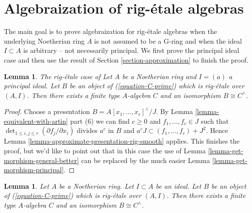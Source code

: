 \documentclass{stacks-project}
\newenvironment{reference}{\comment}{\endcomment}
\theoremstyle{plain}
\newtheorem{lemma}[subsection]{Lemma}
\theoremstyle{definition}
\theoremstyle{remark}
\numberwithin{equation}{subsection}
\begin{document}
\section{Algebraization of rig-\'etale algebras}
\label{section-approximation-principal}

\noindent
The main goal is to prove algebraization for rig-\'etale algebras
when the underlying Noetherian ring $A$ is not assumed to be a G-ring
and when the ideal $I \subset A$ is arbitrary -- not necessarily principal.
We first prove the principal ideal case and then use the result
of Section \ref{section-approximation} to finish the proof.

\begin{lemma}
\label{lemma-approximate-principal}
\begin{reference}
The rig-\'etale case of \cite[III Theorem 7]{Elkik}
\end{reference}
Let $A$ be a Noetherian ring and $I = (a)$ a principal ideal.
Let $B$ be an object of (\ref{equation-C-prime}) which is
rig-\'etale over $(A, I)$.
Then there exists a finite type $A$-algebra $C$ and an
isomorphism $B \cong C^\wedge$.
\end{lemma}

\begin{proof}
Choose a presentation $B = A[x_1, \ldots, x_r]^\wedge/J$.
By Lemma \ref{lemma-equivalent-with-artin} part (6) we can find
$c \geq 0$ and $f_1, \ldots, f_r \in J$ such that
$\det_{1 \leq i, j \leq r}(\partial f_j/\partial x_i)$ divides
$a^c$ in $B$ and
$a^c J \subset (f_1, \ldots, f_r) + J^2$.
Hence Lemma \ref{lemma-approximate-presentation-rig-smooth} applies.
This finishes the proof, but we'd like to point out that in
this case the use of
Lemma \ref{lemma-get-morphism-general-better}
can be replaced by the much easier
Lemma \ref{lemma-get-morphism-principal}.
\end{proof}

\begin{lemma}
\label{lemma-approximate}
Let $A$ be a Noetherian ring. Let $I \subset A$ be an ideal.
Let $B$ be an object of (\ref{equation-C-prime}) which is
rig-\'etale over $(A, I)$.
Then there exists a finite type $A$-algebra $C$ and an
isomorphism $B \cong C^\wedge$.
\end{lemma}
\end{document}
